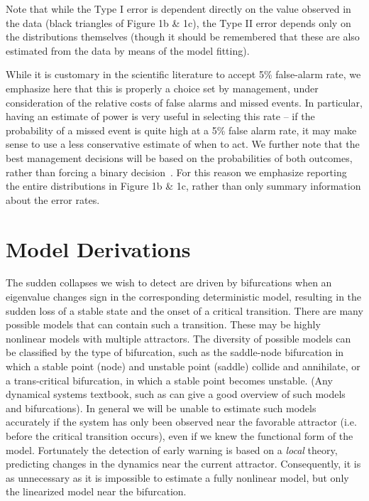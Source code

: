 \documentclass[authoryear, preprint,review,12pt]{elsarticle}
\begin{document}
Note that while the Type I error is dependent directly on the value observed in the data (black triangles of Figure 1b \& 1c),
the Type II error depends only on the distributions themselves (though it should be remembered that these are also estimated from the data by means of the model fitting).  

While it is customary in the scientific literature to accept 5\% false-alarm rate,
we emphasize here that this is properly a choice set by management,
under consideration of the relative costs of false alarms and missed events.
In particular, having an estimate of power is very useful in selecting this rate --
if the probability of a missed event is quite high at a 5\% false alarm rate,
it may make sense to use a less conservative estimate of when to act.
We further note that the best management decisions will be based on the probabilities of both outcomes,
rather than forcing a binary decision~\citep{Brozovic2011}.
For this reason we emphasize reporting the entire distributions in Figure 1b \& 1c, rather than only summary information about the error rates.  



\section{Model Derivations}\label{modelderivations}
The sudden collapses we wish to detect are driven by bifurcations when an eigenvalue changes sign in the corresponding deterministic model,
resulting in the sudden loss of a stable state and the onset of a critical transition.
There are many possible models that can contain such a transition.
These may be highly nonlinear models with multiple attractors.
The diversity of possible models can be classified by the type of bifurcation,
such as the saddle-node bifurcation in which a stable point (node) and unstable point (saddle) collide and annihilate,
or a trans-critical bifurcation, in which a stable point becomes unstable.  
(Any dynamical systems textbook, such as \citep{Guckenheimer1983} can give a good overview of such models and bifurcations). 
In general we will be unable to estimate such models accurately if the system has only been observed near the favorable attractor (i.e. before the critical transition occurs),
even if we knew the functional form of the model.  Fortunately the detection of early warning is based on a \emph{local} theory, predicting changes in the dynamics near the current attractor.
Consequently, it is as unnecessary as it is impossible to estimate a fully nonlinear model, but only the linearized model near the bifurcation.
\end{document}

